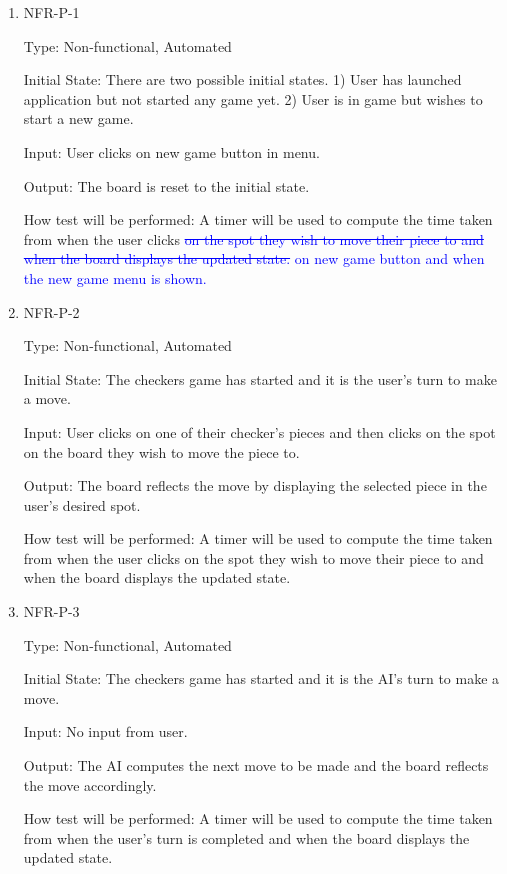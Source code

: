 \documentclass[12pt, titlepage]{article}
\begin{document}
\begin{enumerate}

\item{NFR-P-1\\}

Type: Non-functional, Automated
					
Initial State: There are two possible initial states. 1) User has launched application but not started any game yet. 2) User is in game but wishes to start a new game.
					
Input: User clicks on new game button in menu.
					
Output: The board is reset to the initial state.
					
How test will be performed: A timer will be used to compute the time taken from when the user clicks \textcolor{blue}{\sout{on the spot they wish to move their piece to and when the board displays the updated state.} on new game button and when the new game menu is shown.}

\item{NFR-P-2\\}

Type: Non-functional, Automated
					
Initial State: The checkers game has started and it is the user's turn to make a move.
					
Input: User clicks on one of their checker's pieces and then clicks on the spot on the board they wish to move the piece to. 
					
Output: The board reflects the move by displaying the selected piece in the user's desired spot.
					
How test will be performed: A timer will be used to compute the time taken from when the user clicks on the spot they wish to move their piece to and when the board displays the updated state.

\item{NFR-P-3\\}

Type: Non-functional, Automated
					
Initial State: The checkers game has started and it is the AI's turn to make a move.
					
Input: No input from user.
					
Output: The AI computes the next move to be made and the board reflects the move accordingly.
					
How test will be performed: A timer will be used to compute the time taken from when the user's turn is completed and when the board displays the updated state.


\end{enumerate}
\end{document}
